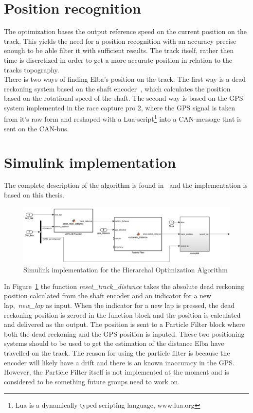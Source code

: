 \section{Position recognition}\label{sec:opt_pos_recon}
The optimization bases the output reference speed on the current position on the
track. This yields the need for a position recognition with an accuracy precise
enough to be able filter it with sufficient results. The track itself, rather
then time is discretized in order to get a more accurate position in relation to
the tracks topography. \\
There is two ways of finding Elba's position on the track. The first way is a dead
reckoning system based on the shaft encoder~\cite[p.~49]{elba2015},
which calculates the position based on the rotational speed of the shaft. The
second way is based on the GPS system implemented in the race capture pro 2,
where the GPS signal is taken from it's raw form and reshaped with a
Lua-script\footnote{Lua is a dynamically typed scripting language, www.lua.org}
into a CAN-message that is sent on the CAN-bus.


\section{Simulink implementation}
The complete description of the algorithm is found in~\cite{liu2016} and the
implementation is based on this thesis.
\begin{figure}[H]
    \centering
    \includegraphics[width=\textwidth]{./img/optimization_cont.png}
    \caption{Simulink implementation for the Hierarchal Optimization
    Algorithm}\label{fig:optimization_cont}
\end{figure}
In Figure~\ref{fig:optimization_cont} the function
\textit{reset\_track\_distance} takes the absolute dead reckoning position
calculated from the shaft encoder and an indicator for a new
lap,~\textit{new\_lap} as input. When the indicator for a new lap is pressed,
the dead reckoning position is zeroed in the function block and the position is
calculated and delivered as the output. The position is sent to a Particle
Filter block where both the dead reckoning and the GPS position is inputed.
These two positioning systems should to be used to get the estimation of the
distance Elba have travelled on the track. The reason for using the particle
filter is because the encoder will likely have a drift and there is an known
inaccuracy in the GPS\@. However, the Particle Filter itself is not implemented at
the moment and is considered to be something future groups need to work on.

